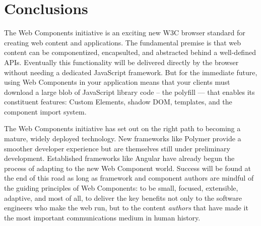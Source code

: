 \chapter{Conclusions}
%

The Web Components initiative is an exciting new W3C browser standard for creating web content and applications.
The fundamental premise is that web content can be componentized, encapsulted, and abstracted behind a well-defined APIs.
Eventually this functionality will be delivered directly by the browser without needing a dedicated JavaScript framework.
But for the immediate future, using Web Components in your application means that your clients must download a large blob of JavaScript library code -- the polyfill --- 
that enables its constituent features: 
Custom Elements, 
shadow DOM, 
templates, and 
the component import system.


The Web Components initiative has set out on the right path to becoming a mature, widely deployed technology. 
New frameworks like Polymer provide a smoother developer experience but are themselves still under preliminary development.
Established frameworks like Angular have already begun the process of adapting to the new Web Component world. 
Success will be found at the end of this road as long as framework and component authors are mindful of the guiding principles of Web Components: 
to be small, focused, extensible, adaptive, 
and most of all, 
to deliver the key benefits 
not only to the software engineers who make the web run,
but to the content \textit{authors} that have made it the most important communications medium in human history.

